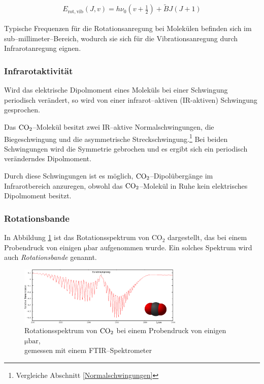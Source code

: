 \documentclass[12pt,a4paper]{scrartcl}
\numberwithin{equation}{section} %
\begin{document}
	\begin{eqnarray}
		E_\mathrm{rot,vib}(J,v) = h \nu_0 \left(v + \frac{1}{2}\right) + \tilde{B} J (J + 1) \label{eq:E rot,vib}
	\end{eqnarray}
	
	\noindent
	Typische Frequenzen für die Rotationsanregung bei Molekülen befinden sich im sub--millimeter--Bereich, wodurch sie sich für die Vibrationsanregung durch Infrarotanregung eignen.
	
	\hypertarget{infrarotaktivituxe4t}{\subsubsection{Infrarotaktivität}\label{infrarotaktivituxe4t}}
	Wird das elektrische Dipolmoment eines Moleküls bei einer Schwingung periodisch verändert, so wird von einer infrarot--aktiven (IR-aktiven) Schwingung gesprochen.
	
	Das $\ce{CO_2}$--Molekül besitzt zwei  IR--aktive Normalschwingungen, die Biegeschwingung und die asymmetrische Streckschwingung.\footnote{Vergleiche Abschnitt \ref{Normalschwingungen}} Bei beiden Schwingungen wird die Symmetrie gebrochen und es ergibt sich ein periodisch veränderndes Dipolmoment.
	
	Durch diese Schwingungen ist es möglich, $\ce{CO_2}$--Dipolübergänge im Infrarotbereich anzuregen, obwohl das $\ce{CO_2}$--Molekül  in Ruhe kein elektrisches Dipolmoment besitzt. \cite{HakenWolf} %
	
	\hypertarget{Rotationsbande}{\subsubsection{Rotationsbande}\label{Rotationsbande}}
	In Abbildung \ref{fig:rotationsspektrumCO2} ist das Rotationsspektrum von CO$_2$ dargestellt, das bei einem Probendruck von einigen $\mathrm{\mu bar}$ aufgenommen wurde. Ein solches Spektrum wird auch \emph{Rotationsbande} genannt.
	
	\begin{figure}[h!]
		\centering
		\includegraphics[width=0.7\textwidth]{../media/B1.1/Rotationssprektrum_CO2.png}
		\caption{Rotationsspektrum von $\ce{CO_2}$ bei einem Probendruck von einigen $\mathrm{\mu bar}$,\\
			gemessen mit einem FTIR--Spektrometer \cite{UzK}}
		\label{fig:rotationsspektrumCO2}
	\end{figure}
	
\end{document}
